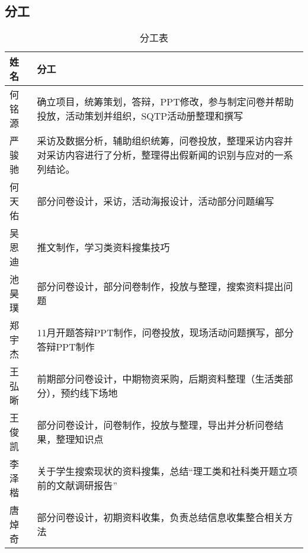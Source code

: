 \subsection{分工}
\begin{table}[H]
    \centering
    \caption{分工表}
    \begin{tabularx}{\textwidth}{>{\raggedright\arraybackslash}X >{\raggedright\arraybackslash}X}
      \toprule
      姓名  &   分工\\
      \midrule
        何铭源 &    确立项目，统筹策划，答辩，PPT修改，参与制定问卷并帮助投放，活动策划并组织，SQTP活动册整理和撰写\\
        严骏驰 &    采访及数据分析，辅助组织统筹，问卷投放，整理采访内容并对采访内容进行了分析，整理得出假新闻的识别与应对的一系列结论。\\
        何天佑 &    部分问卷设计，采访，活动海报设计，活动部分问题编写\\
        吴恩迪 &    推文制作，学习类资料搜集技巧\\
        池昊璞 &    部分问卷设计，部分问卷制作，投放与整理，搜索资料提出问题\\
        郑宇杰 &    11月开题答辩PPT制作，问卷投放，现场活动问题撰写，部分答辩PPT制作\\
        王弘晰 &    前期部分问卷设计，中期物资采购，后期资料整理（生活类部分），预约线下场地\\
        王俊凯 &    部分问卷设计，问卷制作，投放与整理，导出并分析问卷结果，整理知识点\\
        李泽楷 &    关于学生搜索现状的资料搜集，总结“理工类和社科类开题立项前的文献调研报告”\\
        唐焯奇 &    部分问卷设计，初期资料收集，负责总结信息收集整合相关方法 \\
      \bottomrule
    \end{tabularx}
  \end{table}
